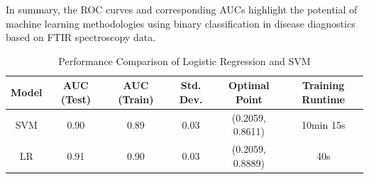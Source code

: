 \documentclass{cernatsnote}
\begin{document}
In summary, the ROC curves and corresponding AUCs highlight the potential of machine learning methodologies using binary classification in disease diagnostics based on FTIR spectroscopy data.

\begin{table}[h]
\centering
\caption{Performance Comparison of Logistic Regression and SVM \footnotemark}
\begin{tabular}{|c|c|c|c|c|c|}
\hline
\textbf{Model} & \textbf{AUC (Test)} & \textbf{AUC (Train)} & \textbf{Std. Dev.} & \textbf{Optimal Point} & \textbf{Training Runtime} \\
\hline
SVM & 0.90 & 0.89 & 0.03 & (0.2059, 0.8611) & 10min 15s\\
\hline
LR & 0.91 & 0.90 & 0.03 & (0.2059, 0.8889) & 40s \\
\hline
\end{tabular}
\label{results}
\end{table}



\newpage




\end{document}
